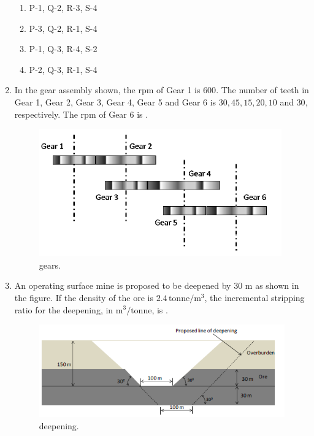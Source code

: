 \documentclass[journal]{IEEEtran}
\begin{document}
\begin{enumerate}
\begin{enumerate}
\item P-1, Q-2, R-3, S-4
    \item P-3, Q-2, R-1, S-4
    \item P-1, Q-3, R-4, S-2
    \item P-2, Q-3, R-1, S-4
\end{enumerate}
\hfill{}

\item In the gear assembly shown, the rpm of Gear 1 is $600$. 
The number of teeth in Gear 1, Gear 2, Gear 3, Gear 4, Gear 5 and Gear 6 is 
$30, 45, 15, 20, 10$ and $30$, respectively. 
The rpm of Gear 6 is \underline{\hspace{2cm}}.

\begin{figure}[h!]
    \centering
    \includegraphics[width=0.75\linewidth]{figs/gears.png}
    \caption{gears.}
    \label{fig:gears}
\end{figure}
\hfill{}

\item An operating surface mine is proposed to be deepened by $30$ m as shown in the figure. 
If the density of the ore is $2.4\,\mathrm{tonne/m^3}$, the incremental stripping ratio for the deepening, 
in $\mathrm{m^3/tonne}$, is \underline{\hspace{2cm}}.

\begin{figure}[h!]
    \centering
    \includegraphics[width=0.85\linewidth]{figs/deepening.png}
    \caption{deepening.}
    \label{fig:deepening}
\end{figure}
\hfill{}


\end{enumerate}
\end{document}
